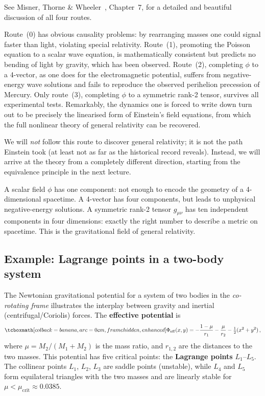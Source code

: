 See Misner, Thorne \& Wheeler~\cite{MTW73}, Chapter~7, for a
detailed and beautiful discussion of all four routes.

Route~(0) has obvious causality problems: by rearranging masses one
could signal faster than light, violating special relativity.
Route~(1), promoting the Poisson equation to a scalar wave
equation, is mathematically consistent but predicts no bending of
light by gravity, which has been observed.  Route~(2), completing
$\phi$ to a 4-vector, as one does for the electromagnetic
potential, suffers from negative-energy wave solutions and fails to
reproduce the observed perihelion precession of Mercury.  Only
route~(3), completing $\phi$ to a symmetric rank-2 tensor, survives
all experimental tests.  Remarkably, the dynamics one is forced to
write down turn out to be precisely the linearised form of Einstein's
field equations, from which the full nonlinear theory of general
relativity can be recovered.

We will \emph{not} follow this route to discover general relativity;
it is not the path Einstein took (at least not as far as the
historical record reveals).  Instead, we will arrive at the theory
from a completely different direction, starting from the equivalence
principle in the next lecture.

\begin{intuition}
  A scalar field $\phi$ has one component: not enough to encode the
  geometry of a 4-dimensional spacetime.  A 4-vector has four components,
  but leads to unphysical negative-energy solutions.  A symmetric
  rank-2 tensor $g_{\mu\nu}$ has ten independent components in four
  dimensions: exactly the right number to describe a metric on spacetime.
  This is the gravitational field of general relativity.
\end{intuition}

\subsection{Example: Lagrange points in a two-body system}

The Newtonian gravitational potential for a system of two bodies
in the \emph{co-rotating frame} illustrates the interplay between
gravity and inertial (centrifugal/Coriolis) forces.
The \textbf{effective potential} is
\begin{equation}\label{eq:Phi-eff-cr3bp}
  \eqbox{\Phi_{\mathrm{eff}}(x,y)
    = -\frac{1-\mu}{r_1} - \frac{\mu}{r_2}
      - \tfrac{1}{2}(x^2 + y^2)\,,}
\end{equation}
where $\mu = M_2/(M_1+M_2)$ is the mass ratio, and $r_{1,2}$
are the distances to the two masses.
This potential has five critical points: the \textbf{Lagrange
points} $L_1$--$L_5$.  The collinear points $L_1$, $L_2$, $L_3$
are saddle points (unstable), while $L_4$ and $L_5$ form
equilateral triangles with the two masses and are linearly stable
for $\mu < \mu_{\mathrm{crit}} \approx 0.0385$.

